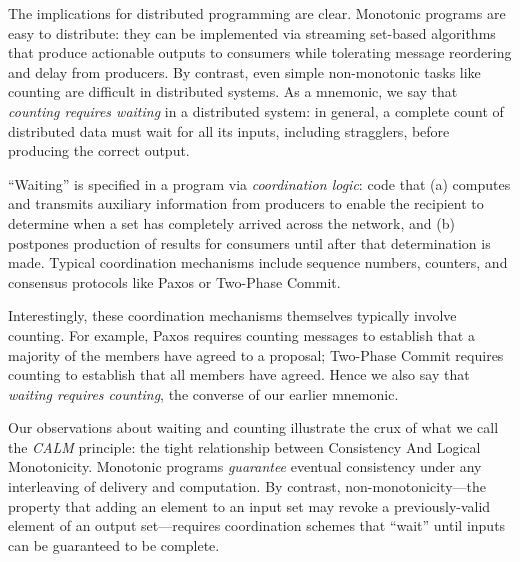 The implications for distributed programming are clear. Monotonic programs are easy to distribute: they can be implemented via streaming set-based algorithms that produce actionable outputs to consumers while tolerating message reordering and delay from producers.  By contrast, even simple non-monotonic tasks like counting are difficult in distributed systems.  As a mnemonic, we say that \emph{counting requires waiting} in a distributed system: in general, a complete count of distributed data must wait for all its inputs, including stragglers, before producing the correct output.

``Waiting'' is specified in a program via \emph{coordination logic}: code that (a) computes and transmits auxiliary information from producers to enable the recipient to determine when a set has completely arrived across the network, and (b) postpones production of results for consumers until after that determination is made.  Typical coordination mechanisms include sequence numbers, counters, and consensus protocols like Paxos or Two-Phase Commit.

Interestingly, these coordination mechanisms themselves typically involve
counting.  For example, Paxos requires counting messages to establish that a
majority of the members have agreed to a proposal; Two-Phase Commit requires
counting to establish that all members have agreed.  Hence we also say that
\emph{waiting requires counting}, the converse of our earlier mnemonic.

Our observations about waiting and counting illustrate the crux of what we call the \emph{CALM} principle: the tight relationship between Consistency And Logical Monotonicity.  Monotonic programs \emph{guarantee} eventual consistency under any interleaving of delivery and computation.  By contrast, non-monotonicity---the property that adding an element to an input set may revoke a previously-valid element of an output set---requires coordination schemes that ``wait'' until inputs can be guaranteed to be complete.  

